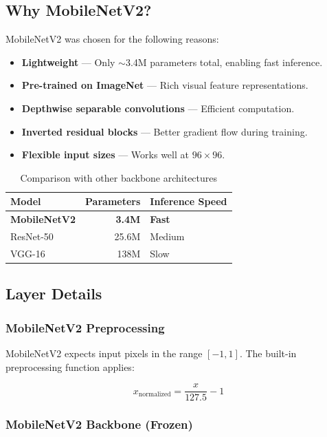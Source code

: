 \documentclass[12pt,a4paper]{article}
\begin{document}
\subsection{Why MobileNetV2?}

MobileNetV2 was chosen for the following reasons:

\begin{itemize}
    \item \textbf{Lightweight} --- Only $\sim$3.4M parameters total, enabling fast inference.
    \item \textbf{Pre-trained on ImageNet} --- Rich visual feature representations.
    \item \textbf{Depthwise separable convolutions} --- Efficient computation.
    \item \textbf{Inverted residual blocks} --- Better gradient flow during training.
    \item \textbf{Flexible input sizes} --- Works well at $96 \times 96$.
\end{itemize}

\begin{table}[H]
    \centering
    \caption{Comparison with other backbone architectures}
    \begin{tabular}{@{}lrl@{}}
        \toprule
        \textbf{Model} & \textbf{Parameters} & \textbf{Inference Speed} \\
        \midrule
        \textbf{MobileNetV2} & \textbf{3.4M} & \textbf{Fast} \\
        ResNet-50     & 25.6M  & Medium \\
        VGG-16        & 138M   & Slow \\
        \bottomrule
    \end{tabular}
\end{table}

\subsection{Layer Details}

\subsubsection{MobileNetV2 Preprocessing}

MobileNetV2 expects input pixels in the range $[-1, 1]$. The built-in preprocessing function applies:

$$x_{\text{normalized}} = \frac{x}{127.5} - 1$$

\subsubsection{MobileNetV2 Backbone (Frozen)}
\end{document}
